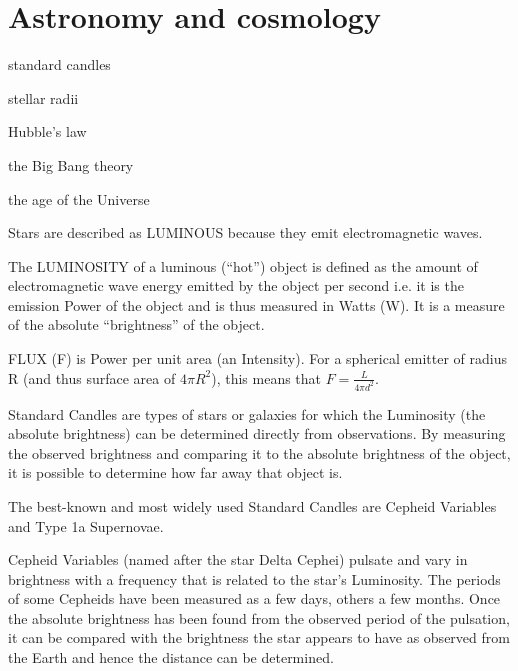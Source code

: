 \documentclass[revision-guide.tex]{subfiles}
\begin{document}
\raggedbottom
\chapter{Astronomy and cosmology}
\begin{content}
    \item standard candles
    \item stellar radii
    \item Hubble's law
    \item the Big Bang theory
    \item the age of the Universe
\end{content}
Stars are described as LUMINOUS because they emit electromagnetic waves.

The LUMINOSITY of a luminous (``hot'') object is defined as the amount
of electromagnetic wave energy emitted by the object per second i.e. it
is the emission Power of the object and is thus measured in Watts (W).
It is a measure of the absolute ``brightness'' of the object.

FLUX (F) is Power per unit area (an Intensity). For a spherical emitter
of radius R (and thus surface area of $ 4\pi R^{2}$), this
means that $F = \frac{L}{4\pi d^2}$.


Standard Candles are types of stars or galaxies for which the Luminosity
(the absolute brightness) can be determined directly from observations.
By measuring the observed brightness and comparing it to the absolute
brightness of the object, it is possible to determine how far away that
object is.

The best-known and most widely used Standard Candles are Cepheid
Variables and Type 1a Supernovae.

Cepheid Variables (named after the star Delta Cephei) pulsate and vary
in brightness with a frequency that is related to the star's Luminosity.
The periods of some Cepheids have been measured as a few days, others a
few months. Once the absolute brightness has been found from the
observed period of the pulsation, it can be compared with the brightness
the star appears to have as observed from the Earth and hence the
distance can be determined.
\end{document}
